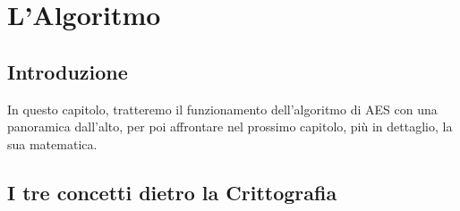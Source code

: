 
\chapter{L'Algoritmo} %










\section{Introduzione}

\textsf{\small In questo capitolo, tratteremo il funzionamento dell'algoritmo di AES con una panoramica dall'alto, per poi affrontare nel prossimo capitolo, più in dettaglio, la sua matematica.}



\section{I tre concetti dietro la Crittografia} %

